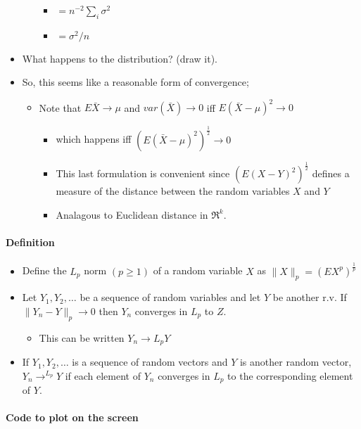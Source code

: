 \begin{itemize}
\begin{itemize}
\begin{itemize}
\item $= n^{-2}\sum_i \sigma^2$
\item $= \sigma^2/n$
\end{itemize}
\end{itemize}
\item What happens to the distribution? (draw it).
\item So, this seems like a reasonable form of convergence;
\begin{itemize}
\item Note that $E \bar X \to \mu$ and $var(\bar X) \to 0$ iff
          $E(\bar X - \mu)^2 \to 0$
\begin{itemize}
\item which happens iff $(E(\bar X - \mu)^2)^{\frac12} \to 0$
\item This last formulation is convenient since
            $(E(X-Y)^2)^{\frac12}$ defines a measure of the distance
            between the random variables $X$ and $Y$
\item Analagous to Euclidean distance in $\Re^k$.
\end{itemize}
\end{itemize}
\end{itemize}
\paragraph{Definition}
\label{sec-1-2-1}

\begin{itemize}
\item Define the $L_p$ norm $(p \geq 1)$ of a random variable $X$ as $\|X\|_p = (E X^p)^{\frac1p}$
\item Let $Y_1, Y_2, \dots$ be a sequence of random variables and let
        $Y$ be another r.v.  If $\|Y_n - Y\|_p \to 0$ then $Y_n$
        converges in $L_p$ to $Z$.
\begin{itemize}
\item This can be written $Y_n \to{L_p} Y$
\end{itemize}
\item If $Y_1,Y_2,\dots$ is a sequence of random vectors and $Y$ is
        another random vector, $Y_n \to^{L_p} Y$ if each element of
        $Y_n$ converges in $L_p$ to the corresponding element of $Y$.
\end{itemize}
\paragraph{Code to plot on the screen}
\label{sec-1-2-2}

